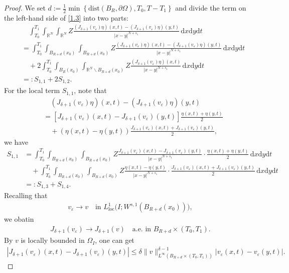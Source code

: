 \documentclass[reqno,10pt]{amsart}
\numberwithin{equation}{section}
\begin{document}
\begin{proof}
	We set $d:=\frac{1}{2}\min{\left\lbrace \mathrm{dist}\left( B_R,\partial\Omega\right) , T_0, T-T_1\right\rbrace }$ and divide the term on the left-hand side of \eqref{1.3} into two parts:
	\begin{align*}
		&\quad\int_{T_0}^{T_1}\int_{\mathbb{R}^N}\int_{\mathbb{R}^N}Z\frac{\left( J_{\delta+1}(v_\varepsilon)\eta\right) (x,t)-\left( J_{\delta+1}(v_\varepsilon)\eta\right) (y,t)}{|x-y|^{N+s_1}}\,\mathrm{d}x\mathrm{d}y\mathrm{d}t\\
		&=\int_{T_0}^{T_1}\int_{B_{R+d}(x_0)}\int_{B_{R+d}(x_0)}Z\frac{\left( J_{\delta+1}(v_\varepsilon)\eta\right) (x,t)-\left( J_{\delta+1}(v_\varepsilon)\eta\right) (y,t)}{|x-y|^{N+s_1}}\,\mathrm{d}x\mathrm{d}y\mathrm{d}t\\
		&\quad+2\int_{T_0}^{T_1}\int_{B_{R}(x_0)}\int_{\mathbb{R}^N\backslash B_{R+d}(x_0)}Z\frac{\left( J_{\delta+1}(v_\varepsilon)\eta\right)(x,t)}{|x-y|^{N+s_1}}\,\mathrm{d}x\mathrm{d}y\mathrm{d}t\\
		&=:S_{1,1}+2S_{1,2}.
	\end{align*}
	For the local term $S_{1,1}$, note that
	\begin{align*}
		&\quad\left( J_{\delta+1}(v_\varepsilon)\eta\right)(x,t)-\left( J_{\delta+1}(v_\varepsilon)\eta\right)(y,t)\\
		&=\left[ J_{\delta+1}(v_\varepsilon)(x,t)-J_{\delta+1}(v_\varepsilon)(y,t)\right]\frac{\eta(x,t)+\eta(y,t)}{2}\\
		&\quad+\left( \eta(x,t)-\eta(y,t)\right)\frac{J_{\delta+1}(v_\varepsilon)(x,t)+J_{\delta+1}(v_\varepsilon)(y,t)}{2},
	\end{align*}
	we have
	\begin{align*}
		S_{1,1}&=\int_{T_0}^{T_1}\int_{B_{R+d}(x_0)}\int_{B_{R+d}(x_0)}Z\frac{J_{\delta+1}(v_\varepsilon)(x,t)-J_{\delta+1}(v_\varepsilon)(y,t)}{|x-y|^{N+s_1}}\cdot\frac{\eta(x,t)+\eta(y,t)}{2}\,\mathrm{d}x\mathrm{d}y\mathrm{d}t\\
		&\quad+\int_{T_0}^{T_1}\int_{B_{R+d}(x_0)}\int_{B_{R+d}(x_0)}Z\frac{\eta(x,t)-\eta(y,t)}{|x-y|^{N+s_1}}\cdot\frac{J_{\delta+1}(v_\varepsilon)(x,t)+J_{\delta+1}(v_\varepsilon)(y,t)}{2}\,\mathrm{d}x\mathrm{d}y\mathrm{d}t\\
		&=:S_{1,3}+S_{1,4}.
	\end{align*}
	Recalling that
	\begin{align*}
		v_\varepsilon\rightarrow v\quad\text{in }  L^1_{\mathrm{loc}}\bigl(I; W^{s,1}\left(B_{R+d}(x_0)\right)\bigl),
	\end{align*}
	we obatin
	\begin{align}
		\label{1.5}
		J_{\delta+1}(v_\varepsilon)\rightarrow J_{\delta+1}(v)\quad\text{a.e. in }B_{R+d}\times(T_0,T_1).
	\end{align}
	By $v$ is locally bounded in $\Omega_I$, one can get
	\begin{align}
		\label{1.51}
		\left| J_{\delta+1}(v_\varepsilon)(x,t)-J_{\delta+1}(v_\varepsilon)(y,t)\right|\le \delta\|v\|_{L^\infty(B_{R+d}\times(T_0,T_1))}^{\delta-1}|v_\varepsilon(x,t)-v_\varepsilon(y,t)|.
	\end{align}
	

\end{proof}
\end{document}
